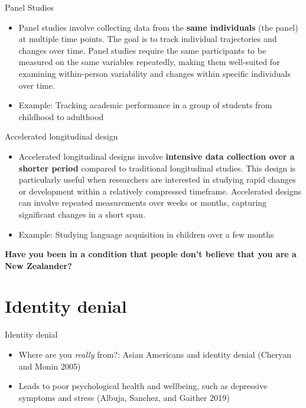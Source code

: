 \documentclass[
  ignorenonframetext,
  aspectratio=169,
]{beamer}
\providecommand{\tightlist}{%
  \setlength{\itemsep}{0pt}\setlength{\parskip}{0pt}}\usepackage{longtable,booktabs,array}
\begin{document}
\begin{frame}{Panel Studies}
\label{panel-studies}
\begin{itemize}[<+->]
\tightlist
\item
  Panel studies involve collecting data from the \textbf{same
  individuals} (the panel) at multiple time points. The goal is to track
  individual trajectories and changes over time. Panel studies require
  the same participants to be measured on the same variables repeatedly,
  making them well-suited for examining within-person variability and
  changes within specific individuals over time.
\item
  Example: Tracking academic performance in a group of students from
  childhood to adulthood
\end{itemize}
\end{frame}

\begin{frame}{Accelerated longitudinal design}
\label{accelerated-longitudinal-design}
\begin{itemize}[<+->]
\tightlist
\item
  Accelerated longitudinal designs involve \textbf{intensive data
  collection over a shorter period} compared to traditional longitudinal
  studies. This design is particularly useful when researchers are
  interested in studying rapid changes or development within a
  relatively compressed timeframe. Accelerated designs can involve
  repeated measurements over weeks or months, capturing significant
  changes in a short span.
\item
  Example: Studying language acquisition in children over a few months
\end{itemize}
\end{frame}

\begin{frame}
\textbf{Have you been in a condition that people don't believe that you
are a New Zealander?}
\end{frame}

\section{Identity denial}\label{identity-denial}

\begin{frame}{Identity denial}
\label{identity-denial-1}
\begin{itemize}[<+->]
\tightlist
\item
  Where are you \emph{really} from?: Asian Americans and identity denial
  (Cheryan and Monin 2005)
\item
  Leads to poor psychological health and wellbeing, such as depressive
  symptoms and stress (Albuja, Sanchez, and Gaither 2019)
\end{itemize}
\end{frame}
\end{document}
